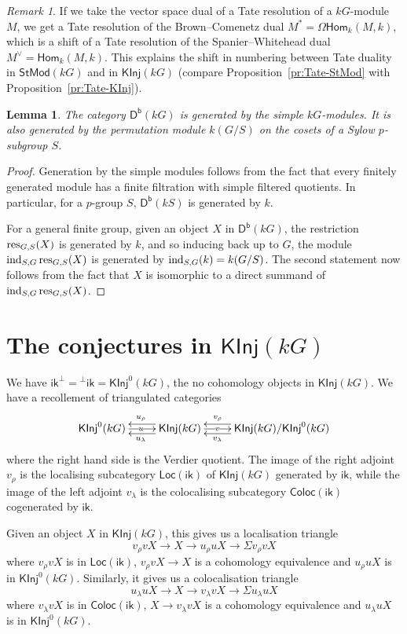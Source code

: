 \documentclass[12pt]{amsart}
\newcommand{\Coloc}{\mathsf{Coloc}}
\newcommand{\DD}{\mathsf{D}}%
\newcommand{\Db}{\DD^{\mathsf{b}}}%
\newcommand{\Hom}{\mathsf{Hom}}
\newcommand{\ik}{\mathsf{ik}}
\newcommand{\ind}{\mathop{\rm ind}}
\newcommand{\kG}{\kk G}
\newcommand{\kk}{k}
\newcommand{\KInj}{\mathsf{KInj}}
\newcommand{\Loc}{\mathsf{Loc}}
\newcommand{\res}{\mathop{\rm res}}
\newcommand{\StMod}{\mathsf{StMod}}
\numberwithin{equation}{section}
\theoremstyle{plain}
\newtheorem{lemma}[equation]{Lemma}
\theoremstyle{definition}
\theoremstyle{remark}
\newtheorem{remark}[equation]{Remark}
\begin{document}
\begin{remark}
If we take the vector space dual of a Tate resolution of a
$\kG$-module $M$, we get  a Tate resolution of the Brown--Comenetz
dual $M^*=\Omega\Hom_{\kk}(M,\kk)$, which is a shift of a Tate resolution of the
Spanier--Whitehead dual $M^\vee=\Hom_\kk(M,\kk)$. This explains 
the shift in numbering between Tate duality in $\StMod(\kG)$ and in
$\KInj(\kG)$ (compare Proposition~\ref{pr:Tate-StMod}
with Proposition~\ref{pr:Tate-KInj}).
\end{remark}


\begin{lemma}\label{le:kG/S-gen}
The category $\Db(\kG)$ is generated by the simple $\kG$-modules. It
is also generated by the permutation module $\kk(G/S)$ on the cosets
of a Sylow $p$-subgroup $S$.
\end{lemma}
\begin{proof}
Generation by the simple modules follows from the fact that every
finitely generated module has a finite filtration with simple filtered
quotients. In particular, for a
$p$-group $S$, $\Db(\kk S)$ is generated by $\kk$.

For a  general finite group, given an object $X$ in $\Db(\kG)$, 
the restriction $\res_{G,S}(X)$ is generated by $\kk$, and so inducing
back up to $G$, the module
$\ind_{S,G}\res_{G,S}(X)$ is generated by $\ind_{S,G}(\kk)=\kk(G/S)$.
The second statement now follows from the fact that $X$ is isomorphic 
to a direct summand of $\ind_{S,G}\res_{G,S}(X)$.
\end{proof}

\section{\texorpdfstring{The conjectures in $\KInj(\kG)$}
{The conjectures in KInj(kG)}}

We have $\ik^\perp={}^\perp\ik=\KInj^0(\kG)$, the
no cohomology objects in $\KInj(\kG)$.
We have a recollement of triangulated categories
\[ \xymatrix{\KInj^0(\kG) \ar[r]|u & \KInj(\kG) 
\ar[r]|(0.37)v\ar@<1ex>[l]^{u_\lambda}\ar@<-1ex>[l]_{u_\rho} & 
\KInj(\kG)/\KInj^0(\kG) \ar@<1ex>[l]^(0.63){v_\lambda}
\ar@<-1ex>[l]_(0.63){v_\rho}} \]
where the right hand side is the Verdier quotient. The image of the
right adjoint
$v_\rho$ is the localising subcategory $\Loc(\ik)$ of $\KInj(\kG)$
generated by $\ik$, while the image of the left adjoint $v_\lambda$ is the colocalising
subcategory $\Coloc(\ik)$ cogenerated by $\ik$. 

Given an object $X$
in $\KInj(\kG)$, this gives us a localisation triangle
\[ v_\rho v X \to X \to u_\rho u X \to \Sigma v_\rho v X \]
where $v_\rho v X$ is in $\Loc(\ik)$, $v_\rho v X \to X$ is a cohomology equivalence and $u_\rho u X$
is in $\KInj^0(\kG)$. Similarly, it gives us a colocalisation triangle
\[ u_\lambda u X \to X \to v_\lambda v X \to \Sigma u_\lambda u X \]
where $v_\lambda v X$ is in $\Coloc(\ik)$, $X \to v_\lambda v X$ is a cohomology equivalence and 
$u_\lambda u X$ is in $\KInj^0(\kG)$.
\end{document}
